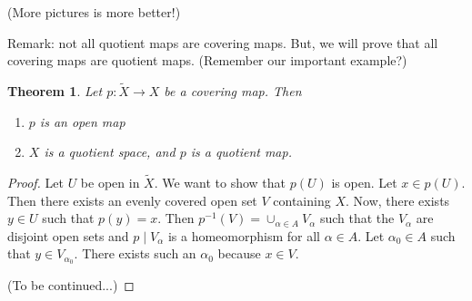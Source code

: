 \documentclass{amsart}
\newtheorem{thm}{Theorem}
\begin{document}
(More pictures is more better!)
\vspace{2 in}

Remark: not all quotient maps are covering maps.  But, we will prove that all covering maps are quotient maps.  (Remember our important example?)

\begin{thm}  Let $p:\tilde{X}\rightarrow X$ be a covering map.  Then
\begin{enumerate}
\item  $p$ is an open map
\item $X$ is a quotient space, and $p$ is a quotient map.
\end{enumerate}
\end{thm}

\begin{proof}  Let $U$ be open in $\tilde{X}$.  We want to show that $p(U)$ is open.  Let $x \in p(U).$  Then there exists an evenly covered open set $V$ containing $X$.  Now, there exists $y \in U$ such that $p(y)=x.$  Then $p^{-1}(V)=\cup_{\alpha \in A}V_{\alpha}$ such that the $V_{\alpha}$ are disjoint open sets and $p \mid V_{\alpha}$ is a homeomorphism for all $\alpha \in A$.  Let $\alpha_0 \in A$ such that $y \in V_{\alpha_0}$.  There exists such an $\alpha_0$ because $x \in V$.

(To be continued...)
\end{proof}
\end{document}
